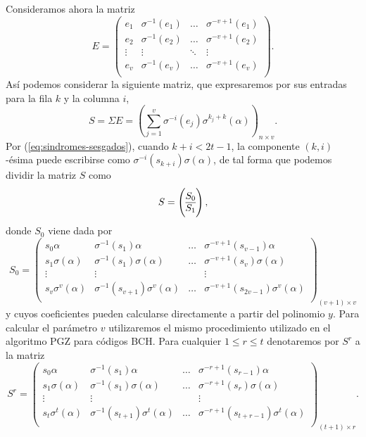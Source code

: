 Consideramos ahora la matriz 
\[
  E = \begin{pmatrix}
    e_1 & \sigma^{-1}(e_1) & \dots & \sigma^{-v + 1}(e_1)\\
    e_2 & \sigma^{-1}(e_2) & \dots & \sigma^{-v + 1}(e_2)\\
    \vdots & \vdots & \ddots & \vdots \\
    e_v & \sigma^{-1}(e_v) & \dots & \sigma^{-v + 1}(e_v)\\
  \end{pmatrix}.
\]
Así podemos considerar la siguiente matriz, que expresaremos por sus entradas para la fila \(k\) y la columna \(i\),
\[
  S = \Sigma E = \left(\sum_{j=1}^v \sigma^{-i}(e_j)\sigma^{k_j+k}(\alpha)\right)_{n \times v}.
\]
Por (\ref{eq:sindromes-sesgados}), cuando \(k + i < 2t - 1\), la componente \((k, i)\)-ésima puede escribirse como \(\sigma^{-i}(s_{k+i})\sigma(\alpha)\), de tal forma que podemos dividir la matriz \(S\) como
\[
  S = \left( \begin{array}{@{}c@{}}
    S_0\\\hline
    S_1
  \end{array}\right),
\]
donde \(S_0\) viene dada por
\[
  S_0 = \begin{pmatrix}
    s_0\alpha & \sigma^{-1}(s_1)\alpha & \dots & \sigma^{-v+1}(s_{v-1})\alpha\\
    s_1\sigma(\alpha) & \sigma^{-1}(s_1)\sigma(\alpha) & \dots & \sigma^{-v+1}(s_{v})\sigma(\alpha)\\
    \vdots & \vdots & & \vdots \\
    s_v\sigma^v(\alpha) & \sigma^{-1}(s_{v+1})\sigma^v(\alpha) & \dots & \sigma^{-v+1}(s_{2v-1})\sigma^v(\alpha)\\
  \end{pmatrix}_{(v + 1) \times v}
\]
y cuyos coeficientes pueden calcularse directamente a partir del polinomio \(y\).
Para calcular el parámetro \(v\) utilizaremos el mismo procedimiento utilizado en el algoritmo PGZ para códigos BCH.
Para cualquier \(1 \leq r \leq t\) denotaremos por \(S^r\) a la matriz
\[
  S^r = \begin{pmatrix}
    s_0\alpha & \sigma^{-1}(s_1)\alpha & \dots & \sigma^{-r+1}(s_{r-1})\alpha\\
    s_1\sigma(\alpha) & \sigma^{-1}(s_1)\sigma(\alpha) & \dots & \sigma^{-r+1}(s_{r})\sigma(\alpha)\\
    \vdots & \vdots & & \vdots \\
    s_t\sigma^t(\alpha) & \sigma^{-1}(s_{t+1})\sigma^t(\alpha) & \dots & \sigma^{-r+1}(s_{t+r-1})\sigma^t(\alpha)\\
  \end{pmatrix}_{(t + 1) \times r}.
\]
